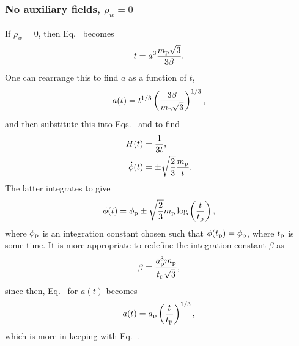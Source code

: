 \subsubsection{No auxiliary fields, $\rho_w=0$}
If $\rho_w=0$, then Eq.\  becomes
%
\begin{equation}
  t = a^3 \frac{m_{\mathrm{p}}\sqrt{3}}{3\beta}.
\end{equation}
%
One can rearrange this to find $a$ as a function of $t$,
%
\begin{equation}
  a(t)
  =
  t^{1/3} \left(\frac{3\beta}{m_{\mathrm{p}}\sqrt{3}}\right)^{1/3},
  \label{eqn:a_of_t_beta_flat}
\end{equation}
%
and then substitute this into Eqs.\  and
 to find
%
\begin{align}
  H(t) 
  &= 
  \frac{1}{3t}, 
  \label{eqn:H_of_t_flat} 
  \\
  \dot{\phi}(t) 
  &= 
  \pm\sqrt{\frac{2}{3}}\frac{m_{\mathrm{p}}}{t}.
  \label{eqn:dotphi_of_t_flat}
\end{align}
%
The latter integrates to give
%
\begin{equation}
  \phi(t) 
  = 
  \phi_{\mathrm{p}} \pm\sqrt{\frac{2}{3}}m_{\mathrm{p}}\log\left(\frac{t}{t_{\mathrm{p}}}\right),  
  \label{eqn:phi_of_t_flat}
\end{equation}
%
where $\phi_{\mathrm{p}}$ is an integration constant chosen such that
$\phi(t_{\mathrm{p}})=\phi_{\mathrm{p}}$, where $t_{\mathrm{p}}$ is some time. It is more appropriate to
redefine the integration constant $\beta$ as
%
\begin{equation}
  \beta 
  \equiv 
  \frac{a_{\mathrm{p}}^3m_{\mathrm{p}}}{t_{\mathrm{p}}\sqrt{3}}, 
  \label{eqn:beta_def}
\end{equation}
%
since then, Eq.\  for $a(t)$ becomes
%
\begin{equation}
  a(t) 
  = 
  a_{\mathrm{p}} \left(\frac{t}{t_{\mathrm{p}}}\right)^{1/3},
  \label{eqn:a_of_t_flat}
\end{equation}
%
which is more in keeping with Eq.\ .  

